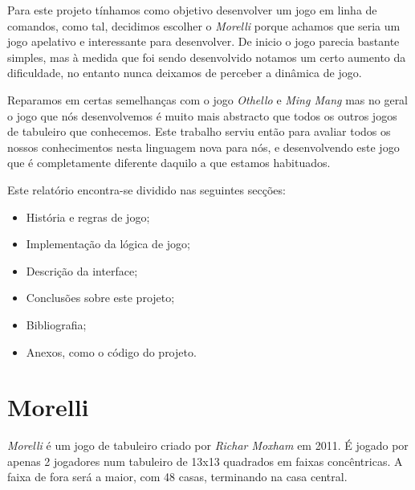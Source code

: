\documentclass[a4paper]{article}
\begin{document}
\par Para este projeto tínhamos como objetivo desenvolver um jogo em linha de comandos, como tal, decidimos escolher o \textit{Morelli} porque achamos que seria um jogo apelativo e interessante para desenvolver. De inicio o jogo parecia bastante simples, mas à medida que foi sendo desenvolvido notamos um certo aumento da dificuldade, no entanto nunca deixamos de perceber a dinâmica de jogo.
\par Reparamos em certas semelhanças com o jogo \textit{Othello} e \textit{Ming Mang} mas no geral o jogo que nós desenvolvemos é muito mais abstracto que todos os outros jogos de tabuleiro que conhecemos. Este trabalho serviu então para avaliar todos os nossos conhecimentos nesta linguagem nova para nós, e desenvolvendo este jogo que é completamente diferente daquilo a que estamos habituados.
\par Este relatório encontra-se dividido nas seguintes secções: 
\begin{itemize}
	\item História e regras de jogo;
	\item Implementação da lógica de jogo;
	\item Descrição da interface;
	\item Conclusões sobre este projeto;
	\item Bibliografia;
	\item Anexos, como o código do projeto.
\end{itemize}	


\section{Morelli}

\par \textit{Morelli} é um jogo de tabuleiro criado por \textit{Richar Moxham} em 2011. É jogado por apenas 2 jogadores num tabuleiro de 13x13 quadrados em faixas concêntricas. A faixa de fora será a maior, com 48 casas, terminando na casa central. 
\end{document}
